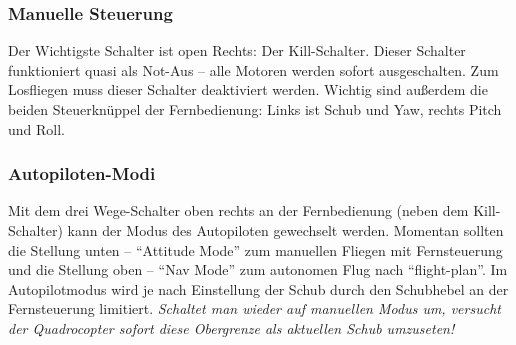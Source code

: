 \subsubsection{Manuelle Steuerung}
Der Wichtigste Schalter ist open Rechts: Der Kill-Schalter. Dieser Schalter funktioniert quasi als Not-Aus – alle Motoren werden sofort ausgeschalten.
Zum Losfliegen muss dieser Schalter deaktiviert werden.
Wichtig sind außerdem die beiden Steuerknüppel der Fernbedienung: Links ist Schub und Yaw, rechts Pitch und Roll.

\subsubsection{Autopiloten-Modi}
Mit dem drei Wege-Schalter oben rechts an der Fernbedienung (neben dem Kill-Schalter) kann der Modus des Autopiloten gewechselt werden.
Momentan sollten die Stellung unten – \enquote{Attitude Mode} zum manuellen Fliegen mit Fernsteuerung und die Stellung oben – \enquote{Nav Mode} zum autonomen Flug nach \enquote{flight-plan}.
Im Autopilotmodus wird je nach Einstellung der Schub durch den Schubhebel an der Fernsteuerung limitiert. \emph{Schaltet man wieder auf manuellen Modus um, versucht der Quadrocopter sofort diese Obergrenze als aktuellen Schub umzuseten!}
